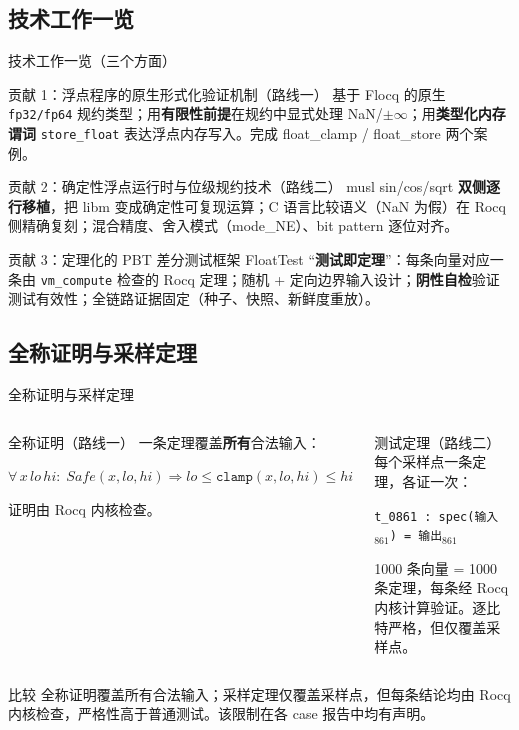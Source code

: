 \documentclass[UTF8,aspectratio=169]{ctexbeamer}
\begin{document}
\subsection{技术工作一览}
\begin{frame}{技术工作一览（三个方面）}
  \begin{block}{贡献 1：浮点程序的原生形式化验证机制（路线一）}
    \small 基于 Flocq 的原生 \texttt{fp32/fp64} 规约类型；用\textbf{有限性前提}在规约中显式处理 NaN/$\pm\infty$；用\textbf{类型化内存谓词} \texttt{store\_float} 表达浮点内存写入。完成 float\_clamp / float\_store 两个案例。
  \end{block}
  \begin{block}{贡献 2：确定性浮点运行时与位级规约技术（路线二）}
    \small musl sin/cos/sqrt \textbf{双侧逐行移植}，把 libm 变成确定性可复现运算；C 语言比较语义（NaN 为假）在 Rocq 侧精确复刻；混合精度、舍入模式（mode\_NE）、bit pattern 逐位对齐。
  \end{block}
  \begin{block}{贡献 3：定理化的 PBT 差分测试框架 FloatTest}
    \small ``\textbf{测试即定理}''：每条向量对应一条由 \texttt{vm\_compute} 检查的 Rocq 定理；随机 + 定向边界输入设计；\textbf{阴性自检}验证测试有效性；全链路证据固定（种子、快照、新鲜度重放）。
  \end{block}
\end{frame}

\subsection{全称证明与采样定理}
\begin{frame}{全称证明与采样定理}
  \begin{columns}[T]
    \begin{block}{全称证明（路线一）}
      \small
      一条定理覆盖\textbf{所有}合法输入：
      \begin{center}\footnotesize
      $\forall\, x\,\mathit{lo}\,\mathit{hi}:\; \mathit{Safe}(x,\mathit{lo},\mathit{hi}) \Rightarrow \mathit{lo} \le \texttt{clamp}(x,\mathit{lo},\mathit{hi}) \le \mathit{hi}$
      \end{center}
      证明由 Rocq 内核检查。
    \end{block}
    \begin{block}{测试定理（路线二）}
      \small
      每个采样点一条定理，各证一次：
      \begin{center}\footnotesize
      \texttt{t\_0861 : spec(输入$_{861}$) = 输出$_{861}$}
      \end{center}
      1000 条向量 = 1000 条定理，每条经 Rocq 内核计算验证。逐比特严格，但仅覆盖采样点。
    \end{block}
  \end{columns}
  \vspace{0.6em}
  \begin{block}{比较}
    \small 全称证明覆盖所有合法输入；采样定理仅覆盖采样点，但每条结论均由 Rocq 内核检查，严格性高于普通测试。该限制在各 case 报告中均有声明。
  \end{block}
\end{frame}
\end{document}
